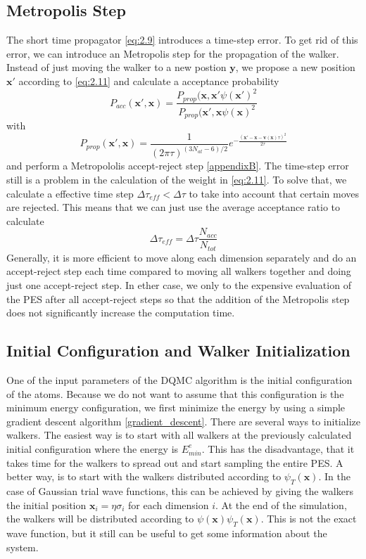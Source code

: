 \documentclass [12pt]{report}
\begin{document}
\subsection{Metropolis Step} \label{metro}
The short time propagator \eqref{eq:2.9} introduces a time-step error. To get rid of this error, we can introduce an Metropolis step for the propagation of the walker. Instead of just moving the walker to a new postion $\bm{y}$, we propose a new position $\bm{x}'$ according to \eqref{eq:2.11} and calculate a acceptance probability 
\begin{equation}\label{Pacc}
P_{acc}(\bm{x}',\bm{x}) = \frac{P_{prop}(\bm{x},\bm{x}' \psi(\bm{x}')^2}{P_{prop}(\bm{x}',\bm{x} \psi(\bm{x})^2}
\end{equation}
with
\begin{equation}\label{Pprop}
P_{prop}(\bm{x}',\bm{x}) = \frac{1}{(2\pi\tau)^{(3N_{at}-6)/2}} e^{-\frac{(\bm{x}'-\bm{x}-\bm{v}(\bm{x})\tau)^2}{2\tau}}
\end{equation}
and perform a Metropololis accept-reject step \ref{appendixB}.
The time-step error still is a problem in the calculation of the weight in \eqref{eq:2.11}. To solve that, we calculate a effective time step $\Delta \tau_{eff} < \Delta \tau$ to take into account that certain moves are rejected. This means that we can just use the average acceptance ratio to calculate
\begin{equation}\label{tau_eff}
\Delta \tau_{eff} = \Delta \tau \frac{N_{acc}}{N_{tot}}
\end{equation}
Generally, it is more efficient to move along each dimension separately and do an accept-reject step each time compared to moving all walkers together and doing just one accept-reject step. In ether case, we only to the expensive evaluation of the PES after all accept-reject steps so that the addition of the Metropolis step does not significantly increase the computation time.
\subsection{Initial Configuration and Walker Initialization}
One of the input parameters of the DQMC algorithm is the initial configuration of the atoms. Because we do not want to assume that this configuration is the minimum energy configuration, we first minimize the energy by using a simple gradient descent algorithm \ref{gradient_descent}.
There are several ways to initialize walkers. The easiest way is to start with all walkers at the previously calculated initial configuration where the energy is $E^e_{min}$. This has the disadvantage, that it takes time for the walkers to spread out and start sampling the entire PES. A better way, is to start with the walkers distributed according to $\psi_T(\bm{x})$. In the case of Gaussian trial wave functions, this can be achieved by giving the walkers the initial position $\bm{x}_i = \eta \sigma_i$ for each dimension $i$.
At the end of the simulation, the walkers will be distributed according to $\psi(\bm{x})\psi_T(\bm{x})$. This is not the exact wave function, but it still can be useful to get some information about the system.
\end{document}
